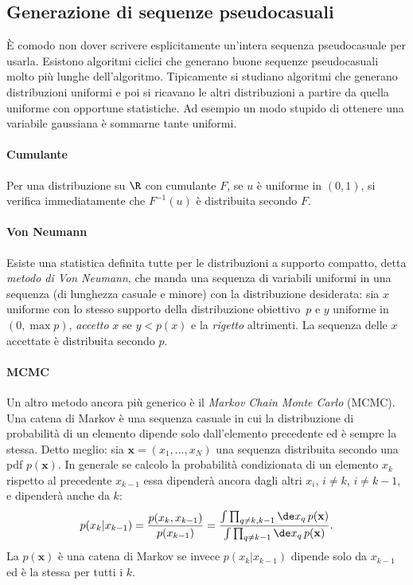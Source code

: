 \subsection{Generazione di sequenze pseudocasuali}

È comodo non dover scrivere esplicitamente un'intera sequenza pseudocasuale per
usarla. Esistono algoritmi ciclici che generano buone sequenze pseudocasuali
molto più lunghe dell'algoritmo. Tipicamente si studiano algoritmi che generano
distribuzioni uniformi e poi si ricavano le altri distribuzioni a partire da
quella uniforme con opportune statistiche. Ad esempio un modo stupido di
ottenere una variabile gaussiana è sommarne tante uniformi.

\paragraph{Cumulante}

Per una distribuzione su $\R$ con cumulante $F$,
se $u$ è uniforme in $(0,1)$,
si verifica immediatamente che $F^{-1}(u)$ è distribuita secondo $F$.

\paragraph{Von Neumann}

Esiste una statistica definita tutte per le distribuzioni a supporto compatto,
detta \emph{metodo di Von Neumann},
che manda una sequenza di variabili uniformi in una sequenza (di lunghezza casuale e minore) con la distribuzione desiderata:
sia $x$ uniforme con lo stesso supporto della distribuzione obiettivo~$p$
e $y$ uniforme in $(0,\max p)$, \emph{accetto} $x$ se $y<p(x)$ e la \emph{rigetto} altrimenti.
La sequenza delle $x$ accettate è distribuita secondo $p$.

\paragraph{MCMC}

Un altro metodo ancora più generico è il \emph{Markov Chain Monte Carlo}
(MCMC). Una catena di Markov è una sequenza casuale in cui la distribuzione di
probabilità di un elemento dipende solo dall'elemento precedente ed è sempre la
stessa. Detto meglio: sia $\mathbf x = (x_1,\dots,x_N)$ una sequenza
distribuita secondo una pdf $p(\mathbf x)$. In generale se calcolo la
probabilità condizionata di un elemento $x_k$ rispetto al precedente $x_{k-1}$
essa dipenderà ancora dagli altri $x_i$, $i \neq k$, $i \neq k-1$, e dipenderà
anche da $k$:
\begin{equation}
    p(x_k|x_{k-1}) = \frac {p(x_k, x_{k-1})} {p(x_{k-1})} = \frac
    {\int \prod_{q \neq k, k-1} \de x_q\, p(\mathbf x)}
    {\int \prod_{q \neq k-1} \de x_q\, p(\mathbf x)}.
\end{equation}
La $p(\mathbf x)$ è una catena di Markov se invece
$p(x_k|x_{k-1})$ dipende solo da $x_{k-1}$ ed è la stessa per tutti i $k$.

